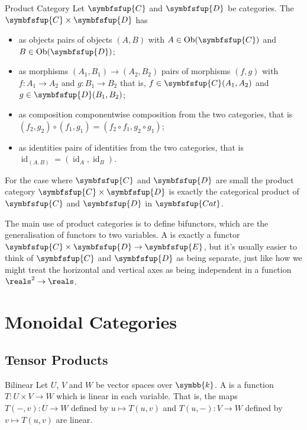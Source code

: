 \documentclass[fleqn]{NotesClass}
\makeatletter
\newcommand{\cat}[1]{\symbfsfup{#1}}
\newcommand{\c@egory}[1]{\symbfsfup{#1}}
\renewcommand{\field}{\symbb{k}}
\newcommand{\Cat}{\c@egory{Cat}}
\DeclareMathOperator{\Ob}{Ob}
\DeclareMathOperator{\id}{id}
\makeatother
\begin{document}
    \begin{dfn}{Product Category}{}
        Let \(\cat{C}\) and \(\cat{D}\) be categories.
        The  \(\cat{C} \times \cat{D}\) has
        \begin{itemize}
            \item as objects pairs of objects \((A, B)\) with \(A \in \Ob(\cat{C})\) and \(B \in \Ob(\cat{D})\);
            \item as morphisms \((A_1, B_1) \to (A_2, B_2)\) pairs of morphisms \((f, g)\) with \(f \colon A_1 \to A_2\) and \(g \colon B_1 \to B_2\) that is, \(f \in \cat{C}(A_1, A_2)\) and \(g \in \cat{D}(B_1, B_2)\);
            \item as composition componentwise composition from the two categories, that is \((f_2, g_2) \circ (f_1, g_1) = (f_2 \circ f_1, g_2 \circ g_1)\);
            \item as identities pairs of identities from the two categories, that is \(\id_{(A, B)} = (\id_A, \id_B)\).
        \end{itemize}
    \end{dfn}
    
    For the case where \(\cat{C}\) and \(\cat{D}\) are small the product category \(\cat{C} \times \cat{D}\) is exactly the categorical product of \(\cat{C}\) and \(\cat{D}\) in \(\Cat\).
    
    The main use of product categories is to define bifunctors, which are the generalisation of functors to two variables.
    A  is exactly a functor \(\cat{C} \times \cat{D} \to \cat{E}\), but it's usually easier to think of \(\cat{C}\) and \(\cat{D}\) as being separate, just like how we might treat the horizontal and vertical axes as being independent in a function \(\reals^2 \to \reals\).
    
    \chapter{Monoidal Categories}
    \section{Tensor Products}
    \begin{dfn}{Bilinear}{}
        Let \(U\), \(V\) and \(W\) be vector spaces over \(\field\).
        A  is a function \(T \colon U \times V \to W\) which is linear in each variable.
        That is, the maps \(T(-, v) \colon U \to W\) defined by \(u \mapsto T(u, v)\) and \(T(u, -) \colon V \to W\) defined by \(v \mapsto T(u, v)\) are linear.
    \end{dfn}
    
\end{document}
